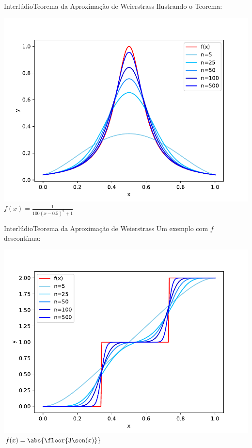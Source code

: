 \documentclass[13pt]{beamer}
\begin{document}
\begin{frame}{Interlúdio}{Teorema da Aproximação de Weierstrass}
    \vspace{3pt}
    Ilustrando o Teorema:
    \begin{center}
        \includegraphics[width=.75\textwidth]{../figuras/weierstrass_cauchy.pdf}
        \( f ( x ) = \frac{ 1 }{ 100 ( x - 0.5 )^2 + 1 } \)
    \end{center}
\end{frame}

\begin{frame}{Interlúdio}{Teorema da Aproximação de Weierstrass}
    \vspace{3pt}
    Um exemplo com \( f \) descontínua:
    \begin{center}
        \includegraphics[width=.75\textwidth]{../figuras/weierstrass_cobrinha.pdf}
        \( f ( x ) = \abs{ \floor{3\sen ( x )} } \)
    \end{center}
\end{frame}
\end{document}
